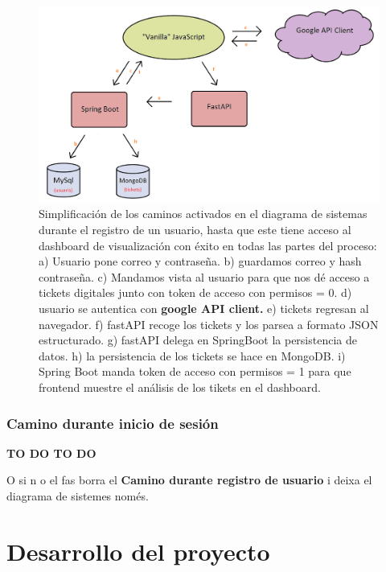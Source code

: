 \documentclass[a4paper,12pt]{report}
\begin{document}
				
				\setlength{\belowcaptionskip}{3pt}
				\FloatBarrier
				\begin{figure}[H]
					\centering
					\includegraphics[width=1\textwidth]{img/diagramaSistemesAplicacioMercappCAMIREGISTRE.png}
					\caption{Simplificación de los caminos activados en el diagrama de sistemas durante el registro de un usuario, hasta que este tiene acceso al dashboard de visualización con éxito en todas las partes del proceso: a) Usuario pone correo y contraseña. b) guardamos correo y hash contraseña. c) Mandamos vista al usuario para que nos dé acceso a tickets digitales junto con token de acceso con permisos = 0. d) usuario se autentica con \textbf{google API client.} e) tickets regresan al navegador. f) fastAPI recoge los  tickets y los parsea a formato JSON estructurado. g) fastAPI delega en SpringBoot la persistencia de datos. h) la persistencia de los tickets se hace en MongoDB. i) Spring Boot manda token de acceso con permisos = 1 para que frontend muestre el análisis de los tikets en el dashboard.}
					\label{fig:diagramaSistemesAplicacioMercappCAMIREGISTRE} 
				\end{figure}
				\FloatBarrier
				
				
		\subsection{Camino durante inicio de sesión}
		
	\textbf{TO DO TO DO}
		
		 O si n o el fas borra el \textbf{Camino durante registro de usuario} i deixa el diagrama de sistemes només.
		
	
	\chapter{Desarrollo del proyecto} %
	
\end{document}
